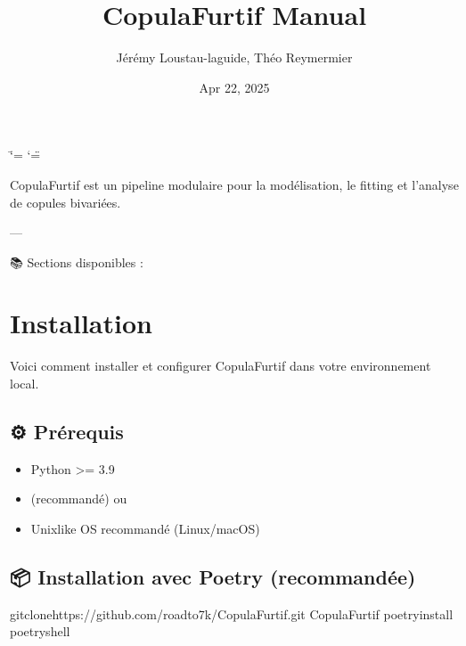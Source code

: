 \documentclass[letterpaper,18pt,english]{sphinxhowto}
\title{CopulaFurtif Manual}
\date{Apr 22, 2025}
\author{Jérémy Loustau-laguide, Théo Reymermier}
\renewcommand{\phantomsection}{\par}
\begin{document}
\ifdefined\shorthandoff
  \ifnum\catcode`\=\string=\active\shorthandoff{=}\fi
  \ifnum\catcode`\"=\active{}\fi
\fi

\pagestyle{empty}
\sphinxmaketitle
\pagestyle{plain}
\sphinxtableofcontents
\pagestyle{normal}
\phantomsection\label{\detokenize{index::doc}}



\sphinxAtStartPar
CopulaFurtif est un pipeline modulaire pour la modélisation, le fitting et l’analyse de copules bivariées.

\sphinxAtStartPar
—

\sphinxAtStartPar
📚 Sections disponibles :

\sphinxstepscope


\section{Installation}
\label{\detokenize{pages/installation:installation}}\label{\detokenize{pages/installation:id1}}\label{\detokenize{pages/installation::doc}}
\sphinxAtStartPar
Voici comment installer et configurer CopulaFurtif dans votre environnement local.


\subsection{⚙️ Prérequis}
\label{\detokenize{pages/installation:prerequis}}\begin{itemize}
\item {} 
\sphinxAtStartPar
Python \textgreater{}= 3.9

\item {} 
\sphinxAtStartPar
{} (recommandé) ou 

\item {} 
\sphinxAtStartPar
Unix\sphinxhyphen{}like OS recommandé (Linux/macOS)

\end{itemize}


\subsection{📦 Installation avec Poetry (recommandée)}
\label{\detokenize{pages/installation:installation-avec-poetry-recommandee}}
\begin{sphinxVerbatim}[commandchars=\\\{\}]
gitclonehttps://github.com/roadto7k/CopulaFurtif.git
CopulaFurtif
poetryinstall
poetryshell
\end{sphinxVerbatim}
\end{document}
